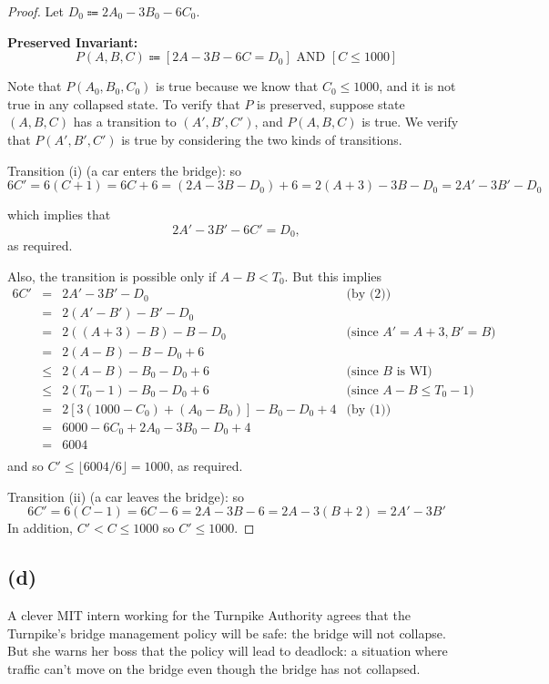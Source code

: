 \documentclass[14pt]{extarticle}
\begin{document}
\begin{proof}
Let $D_0 \Coloneqq 2A_0 - 3B_0 - 6C_0$.

{\bf Preserved Invariant:}
$$
P(A, B, C) \Coloneqq [2A - 3B - 6C = D_0 ] \text{ AND } [C \leq 1000]
$$

Note that $P(A_0, B_0, C_0)$ is true because we know that $C_0 \leq 1000$, and it is not true in any collapsed state. To verify that $P$ is preserved, suppose state $(A, B, C)$ has a transition to $(A', B', C')$, and $P(A, B, C)$ is true. We verify that $P(A', B', C')$ is true by considering the two kinds of transitions. 

Transition (i) (a car enters the bridge): so
$$
6C' = 6(C + 1) = 6C + 6 = (2A - 3B - D_0) + 6 = 2(A + 3) - 3B - D_0 = 2A' - 3B' - D_0
$$

which implies that
$$
2A'- 3B'- 6C'= D_0 ,
$$
as required.

Also, the transition is possible only if $A - B < T_0$. But this implies
$$
\begin{array}{cclr}
6C' & = & 2A' - 3B' - D_0 & \text{(by (2))} \\
    & = & 2(A' - B') - B' - D_0 & \text{} \\
    & = & 2((A + 3) - B) - B - D_0 & \text{(since $A' = A + 3, B' = B$)} \\
    & = & 2(A - B) - B - D_0 + 6 & \text{} \\
    & \leq & 2(A - B) - B_0 - D_0 + 6 & \text{(since $B$ is WI)} \\
    & \leq & 2(T_0 - 1) - B_0 - D_0 + 6 & \text{(since $A - B \leq T_0 - 1$)} \\
    & = & 2[3(1000 - C_0) + (A_0 - B_0)] - B_0 - D_0 + 4 & \text{(by (1))} \\
    & = & 6000 - 6C_0 + 2A_0 - 3B_0 - D_0 + 4 & \text{} \\
    & = & 6004 & \\ 
\end{array}
$$
and so $C' \leq \lfloor 6004/6 \rfloor = 1000$, as required.

Transition (ii) (a car leaves the bridge): so
$$
6C' = 6(C - 1) = 6C - 6 = 2A - 3B - 6 = 2A - 3(B + 2) = 2A' - 3B' 
$$
In addition, $C' < C \leq 1000$ so $C' \leq 1000$.
\end{proof}

\subsection{(d)}
A clever MIT intern working for the Turnpike Authority agrees that the Turnpike’s bridge management policy will be safe: the bridge will not collapse. But she warns her boss that the policy will lead to deadlock: a situation where traffic can’t move on the bridge even though the bridge has not collapsed. 
\end{document}
